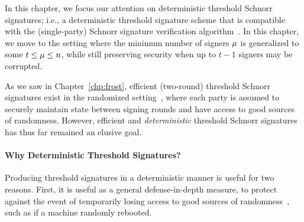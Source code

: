 


In this chapter,
we focus our attention on deterministic threshold Schnorr signatures;
i.e.,
a deterministic threshold signature scheme that is compatible with the (single-party) Schnorr signature verification algorithm~\cite{Schnorr91}.
In this chapter,
we move to the setting where the minimum number of signers $\mu$ is generalized to some $t \leq \mu \leq n$,
while still preserving security when up to $t-1$ signers may be corrupted.


As we saw in Chapter~\ref{chp:frost},
efficient (two-round) threshold Schnorr signatures exist in the randomized setting~\cite{KomloG20,BellareCKMTZ22,RuffingRJSS22},
where each party is assumed to securely maintain state between signing rounds and have access to good sources of randomness.
However,
efficient and \emph{deterministic} threshold Schnorr signatures has thus far remained an elusive goal.

\paragraph{\bf Why Deterministic Threshold Signatures?}
Producing threshold signatures in a deterministic manner is useful for two reasons.
%
First,
it is useful as a general defense-in-depth measure,
to protect against the event of temporarily losing access to good sources of   randomness~\cite{RistenpartY10},
such as if a machine randomly rebooted.

